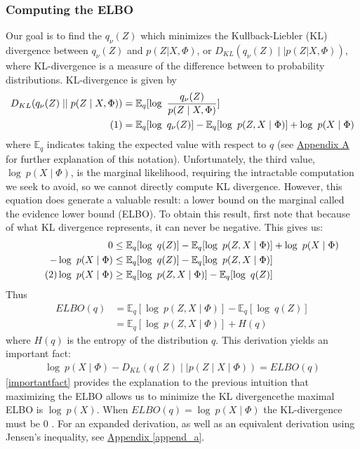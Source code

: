 \documentclass[12pt,letterpaper]{article}
\newcommand\numberthis{\addtocounter{equation}{1}\tag{\theequation}}
\begin{document}
\subsubsection{Computing the ELBO}
Our goal is to find the $q_{\nu}(Z)$ which minimizes the Kullback-Liebler (KL) divergence between $q_{\nu}(Z)$ and $p(Z|X, \Phi)$, or $D_{KL}(q_{\nu}(Z) \mid \mid p(Z|X, \Phi))$, where KL-divergence is a measure of the difference between to probability distributions.  KL-divergence is given by 
\begin{align*}
  \nonumber D_{KL}(q_\nu (Z) \mid \mid  p(Z\mid X,\Phi)) &= \mathbb{E}_q[\log\ \frac{q_\nu(Z)}{p(Z\mid X,\Phi)}] \\
 \numberthis &=  \mathbb{E}_q [\log\ q_\nu(Z)] - \mathbb{E}_q [\log\ p(Z,X\mid \Phi)] + \log\ p(X\mid \Phi) 
\end{align*}
 where $\mathbb{E}_q$ indicates taking the expected value with respect to $q$ (see \hyperref[expectedvalue]{Appendix A} for further explanation of this notation). Unfortunately, the third value, $\log\ p(X\mid \Phi) $, is the marginal likelihood, requiring the intractable computation we seek to avoid, so we cannot directly compute KL divergence. However, this equation does generate a valuable result: a lower bound on the marginal called the evidence lower bound (ELBO). To obtain this result, first note that because of what KL divergence represents, it can never be negative. This gives us: 
\begin{align*}
\nonumber 0 &\leq \mathbb{E}_q [\log\ q(Z)] - \mathbb{E}_q [\log\ p(Z,X \mid \Phi)] + \log\ p(X \mid \Phi)\\
\nonumber - \log\ p(X \mid \Phi) &\leq \mathbb{E}_q [\log\ q(Z)] - \mathbb{E}_q [\log\ p(Z,X \mid \Phi)]  \\
\numberthis\log\ p(X \mid \Phi) &\geq \mathbb{E}_q [\log\ p(Z,X \mid \Phi)] - \mathbb{E}_q [\log\ q(Z)] 
\end{align*}
Thus \begin{align*}
ELBO(q) &=  \mathbb{E}_q [\log\ p(Z,X \mid \Phi)] - \mathbb{E}_q [\log\ q(Z)] \\
&= \mathbb{E}_q [\log\ p(Z,X \mid \Phi)] + H(q) \end{align*}
where $H(q)$ is the entropy of the distribution $q$.
This derivation yields an important fact: 
\begin{align}
\label{importantfact}
\log\ p(X\mid \Phi) - D_{KL}(q(Z) \mid \mid  p(Z\mid X \mid \Phi)) = ELBO(q)
\end{align}
\eqref{importantfact} provides the explanation to the previous intuition that maximizing the ELBO allows us to minimize the KL divergence\textemdash the maximal ELBO is $\log\ p(X)$. When $ELBO(q) = \log\ p(X \mid \Phi)$ the KL-divergence must be 0 \citep{blei:2017}. For an expanded derivation, as well as an equivalent derivation using Jensen's inequality, see \hyperref[append_a]{Appendix \ref*{append_a}}. 
\end{document}
